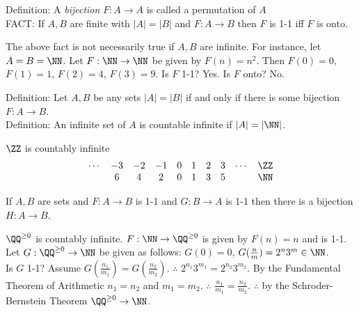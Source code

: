 \noindent
Definition: A \emph{bijection} $F:A\to A$ is called a permutation of $A$ \\
FACT: If $A,B$ are finite with $|A|=|B|$ and $F:A\to B$ then $F$ is 1-1 iff $F$ is onto.
\begin{example}
The above fact is not necessarily true if $A,B$ are infinite. For instance, let $A=B=\NN$. Let $F:\NN\to\NN$ be given by $F(n)=n^2$. Then $F(0)=0$, $F(1)=1$, $F(2)=4$, $F(3)=9$. Is $F$ 1-1? Yes. Is $F$ onto? No. 
\end{example}
\noindent
Definition: Let $A,B$ be any sets $|A|=|B|$ if and only if there is some bijection $F:A\to B$. \\
Definition: An infinite set of $A$ is countable infinite if $|A|=|\NN|$.
\begin{example}
$\ZZ$ is countably infinite
\[ \begin{matrix}
        \cdots & -3 & -2 & -1 & 0 & 1 & 2 & 3 & \cdots & \ZZ \\
               &  6 &  4 &  2 & 0 & 1 & 3 & 5 &        & \NN
   \end{matrix}
\]
\end{example}
\begin{theorem}
If $A,B$ are sets and $F:A\to B$ is 1-1 and $G:B\to A$ is 1-1 then there is a bijection $H:A \to B$.
\end{theorem}
\begin{example}
$\QQ^{\ge 0}$ is countably infinite. $F:\NN\to\QQ^{\ge 0}$ is given by $F(n)=n$ and is 1-1. Let $G:\QQ^{\ge 0}\to\NN$ be given as follows: $G(0)=0$, $G(\frac{n}{m})=2^n3^m\in\NN$. \\
Is $G$ 1-1? Assume $G(\frac{n_1}{m_1})=G(\frac{n_2}{m_2})$. $\therefore$ $2^{n_1}3^{m_1}=2^{n_2}3^{m_2}$. By the Fundamental Theorem of Arithmetic $n_1=n_2$ and $m_1=m_2$. $\therefore$ $\frac{n_1}{m_1}=\frac{n_2}{m_2}$. \ck $\therefore$ by the Schroder-Bernstein Theorem $\QQ^{\ge 0} \to \NN$.
\end{example}


